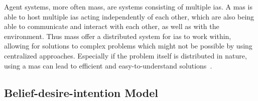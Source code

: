\documentclass[draft,final]{vutinfth} %
\begin{document}
Agent systems, more often \glspl{mas}, are systems consisting of multiple \glspl{ia}. 
A \gls{mas} is able to host multiple \glspl{ia} acting independently of each other, which are also being able to communicate and interact with each other, as well as with the environment. 
Thus \glspl{mas} offer a distributed system for \glspl{ia} to work within, allowing for solutions to complex problems which might not be possible by using centralized approaches. 
Especially if the problem itself is distributed in nature, using a \gls{mas} can lead to efficient and easy-to-understand solutions~\cite{ferber1999multi}. 

\subsection{Belief-desire-intention Model}
\label{chap:bdi}
\end{document}
